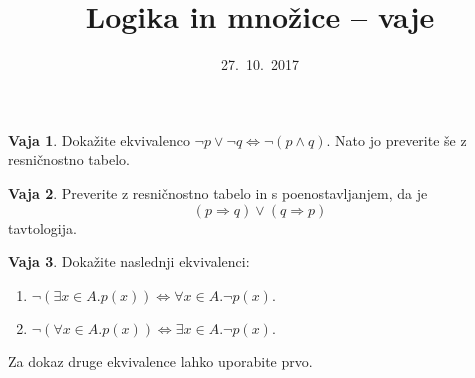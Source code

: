 \documentclass{article}
\newcommand{\lthen}{\Rightarrow}
\theoremstyle{definition}
\newtheorem{vaja}{Vaja}
\begin{document}
\title{Logika in množice -- vaje}
\date{27.~10.~2017}
\maketitle

\begin{vaja}
  Dokažite ekvivalenco $  \lnot p \lor \lnot q  \iff \lnot (p \land q) $.
  Nato jo preverite še z resničnostno tabelo.
\end{vaja}

\begin{vaja}
  Preverite z resničnostno tabelo in s
  poenostavljanjem, da je $$(p \lthen q) \lor (q \lthen p)$$ tavtologija.
\end{vaja}

\begin{vaja}
  Dokažite naslednji ekvivalenci:
  \begin{enumerate}
  \item  %
    $\lnot (\exists x \in A . p(x))
    \iff
    \forall x \in A . \lnot p(x).$
  \item
  $
    \lnot (\forall x \in A . p(x))
    \iff
    \exists x \in A . \lnot p(x).
  $
  \end{enumerate}
  Za dokaz druge ekvivalence lahko uporabite prvo.
\end{vaja}
\end{document}
